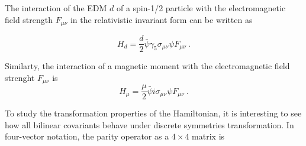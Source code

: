 The interaction of the EDM $d$ of a spin-1/2 particle with the
electromagnetic field strength $F_{\mu \nu}$ in the relativistic
invariant form can be written as

\begin{equation}
\label{eqn:hamiltonianRELelectric}
  H_d = \frac{d}{2} \bar{\psi} \gamma_5 \sigma_{\mu \nu} \psi F_{\mu \nu}~.
\end{equation}

Similarty, the interaction of a magnetic moment with the
electromagnetic field strenght $F_{\mu \nu}$ is
\begin{equation}
\label{eqn:hamiltonianRELmagnetic}
  H_\mu = \frac{\mu}{2} \bar{\psi} i \sigma_{\mu \nu} \psi F_{\mu \nu}~.
\end{equation}

To study the transformation properties of the Hamiltonian, it is
interesting to see how all bilinear covariants behave under discrete
symmetries transformation.
In four-vector notation, the parity operator as a
$4 \times 4$ matrix is

